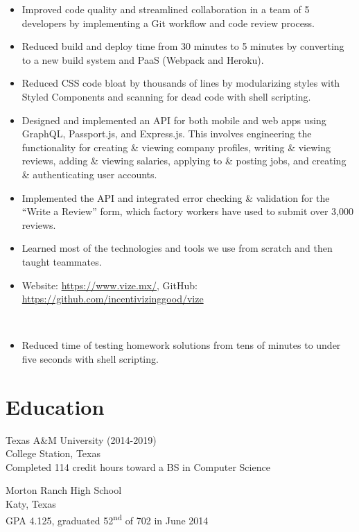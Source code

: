 \documentclass{resume}
\begin{document}
\begin{itemize}
    \item Improved code quality and streamlined collaboration in a team of 5
          developers by implementing a Git workflow and code review process.
    \item Reduced build and deploy time from 30 minutes to 5 minutes by
          converting to a new build system and PaaS (Webpack and Heroku).
    \item Reduced CSS code bloat by thousands of lines by modularizing
          styles with Styled Components and scanning for dead code with
          shell scripting.
    \item Designed and implemented an API for both mobile and web apps using
          GraphQL, Passport.js, and Express.js. This involves engineering the
          functionality for creating \& viewing company profiles, writing \&
          viewing reviews, adding \& viewing salaries, applying to \& posting
          jobs, and creating \& authenticating user accounts.
    \item Implemented the API and integrated error checking \& validation for
          the ``Write a Review'' form, which factory workers have used to submit
          over 3,000 reviews.
    \item Learned most of the technologies and tools we use from scratch and
          then taught teammates.
    \item Website: \href{https://www.vize.mx/}{https://www.vize.mx/},
          GitHub: \href{https://github.com/incentivizinggood/vize}{https://github.com/incentivizinggood/vize}
\end{itemize}

 \\

\begin{itemize}
    \item Reduced time of testing homework solutions from tens of minutes to
          under five seconds with shell scripting.
\end{itemize}

\section{Education}

Texas A\&M University (2014-2019) \\
College Station, Texas \\
Completed 114 credit hours toward a BS in Computer Science

\vspace{1em}
Morton Ranch High School \\
Katy, Texas \\
GPA 4.125, graduated 52\textsuperscript{nd} of 702 in June 2014
\end{document}
